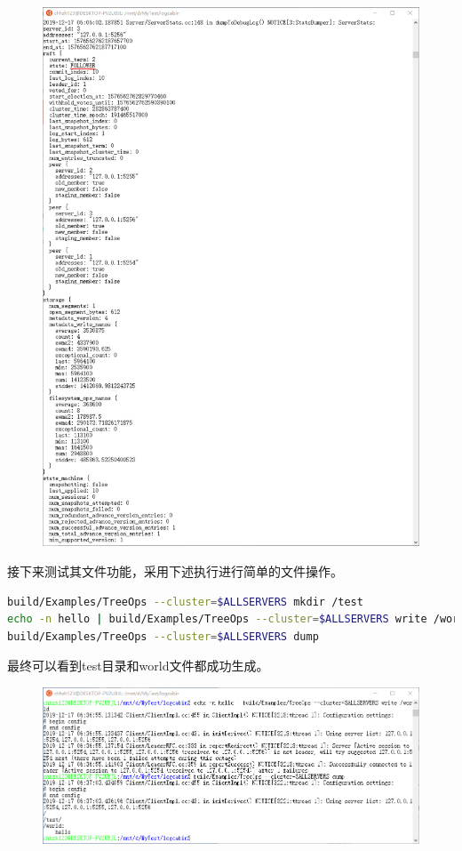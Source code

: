\documentclass[logo,reportComp]{thesis}
\begin{document}
\begin{answer}
\begin{figure}[H]
\includegraphics[width=\linewidth]{fig/follower.png}
\end{figure}

接下来测试其文件功能，采用下述执行进行简单的文件操作。
\begin{lstlisting}[language=bash]
build/Examples/TreeOps --cluster=$ALLSERVERS mkdir /test
echo -n hello | build/Examples/TreeOps --cluster=$ALLSERVERS write /world
build/Examples/TreeOps --cluster=$ALLSERVERS dump
\end{lstlisting}
最终可以看到test目录和world文件都成功生成。
\begin{figure}[H]
\centering
\includegraphics[width=\linewidth]{fig/mk_file.png}
\end{figure}


\end{answer}
\end{document}
